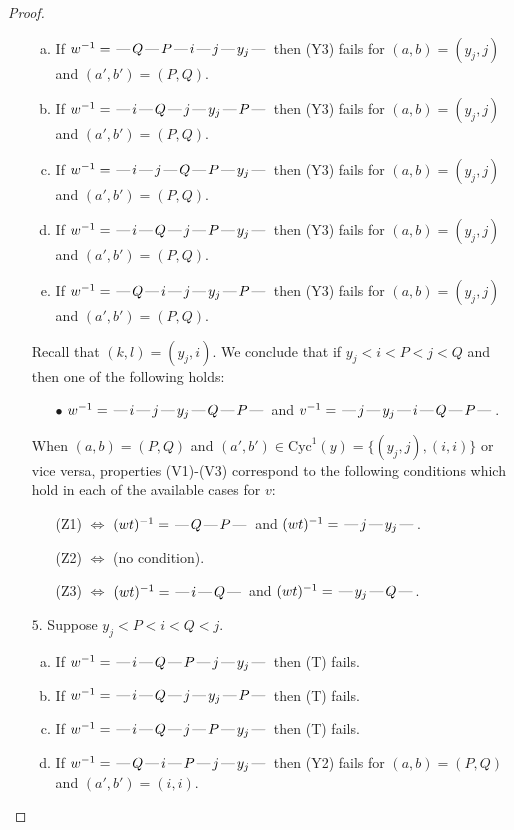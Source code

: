 \documentclass[10pt]{article}
\theoremstyle{definition}
\theoremstyle{definition}
\def\dash{\text{\hspace{0.5mm}---\hspace{0.5mm}}}
\def\Cyc{\mathrm{Cyc}}
\begin{document}
\begin{proof}
\begin{enumerate}
\begin{enumerate}[(a)]
\item If $w^{-1} = \dash Q\dash P\dash i\dash j\dash y_j\dash $ then (Y3) fails for $(a,b)=(y_j,j)$ and $(a',b')=(P,Q)$.
\item If $w^{-1} = \dash i\dash Q\dash j\dash y_j\dash P\dash $ then (Y3) fails for $(a,b)=(y_j,j)$ and $(a',b')=(P,Q)$.
\item If $w^{-1} = \dash i\dash j\dash Q\dash P\dash y_j\dash $ then (Y3) fails for $(a,b)=(y_j,j)$ and $(a',b')=(P,Q)$.
\item If $w^{-1} = \dash i\dash Q\dash j\dash P\dash y_j\dash $ then (Y3) fails for $(a,b)=(y_j,j)$ and $(a',b')=(P,Q)$.
\item If $w^{-1} = \dash Q\dash i\dash j\dash y_j\dash P\dash $ then (Y3) fails for $(a,b)=(y_j,j)$ and $(a',b')=(P,Q)$.
\end{enumerate}
Recall that $(k,l) = (y_j,i)$.
We conclude that if $y_j < i < P < j < Q$ and then one of the following holds:
\begin{enumerate}
\item[$\bullet$] $w^{-1} = \dash i\dash j\dash y_j\dash Q\dash P\dash $ and $v^{-1} = \dash j\dash y_j\dash i\dash Q\dash P\dash $.
\end{enumerate}
When $(a,b)= (P,Q)$ and $(a',b')\in \Cyc^1(y)=\{(y_j,j),(i,i)\}$ or vice versa,
properties (V1)-(V3) correspond to the following conditions which hold in
each of the available cases for $v$:
\begin{enumerate}
\item[](Z1) $\Leftrightarrow$ $(wt)^{-1} = \dash Q \dash P \dash$  and $(wt)^{-1} = \dash j \dash y_j \dash$.
\item[](Z2) $\Leftrightarrow$ (no condition).
\item[](Z3) $\Leftrightarrow$ $(wt)^{-1} = \dash i \dash Q \dash$  and $(wt)^{-1} = \dash y_j \dash Q \dash$.
\end{enumerate}
\item[$5$.] Suppose $y_j < P < i < Q < j$.
\begin{enumerate}[(a)]
\item If $w^{-1} = \dash i\dash Q\dash P\dash j\dash y_j\dash $ then (T) fails.
\item If $w^{-1} = \dash i\dash Q\dash j\dash y_j\dash P\dash $ then (T) fails.
\item If $w^{-1} = \dash i\dash Q\dash j\dash P\dash y_j\dash $ then (T) fails.
\item If $w^{-1} = \dash Q\dash i\dash P\dash j\dash y_j\dash $ then (Y2) fails for $(a,b)=(P,Q)$ and $(a',b')=(i,i)$.

\end{enumerate}
\end{enumerate}
\end{proof}
\end{document}
